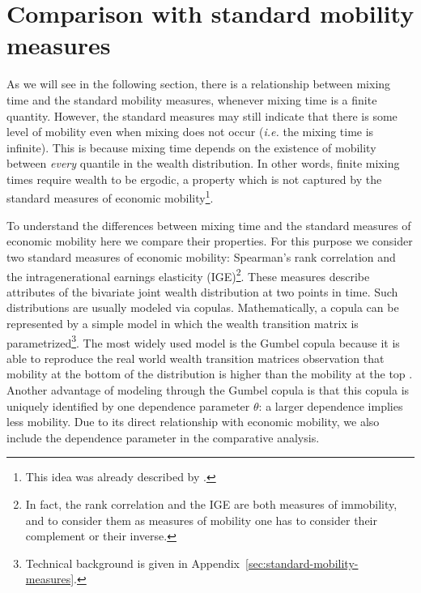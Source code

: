 \documentclass[11pt]{article}
\newcommand{\ie}{{\it i.e.}\xspace}
\numberwithin{equation}{section}
\begin{document}
\section{Comparison with standard mobility measures}
\label{sec:standard-measures}

As we will see in the following section, there is a relationship between mixing time and the standard mobility measures, whenever mixing time is a finite quantity. However, the standard measures may still indicate that there is some level of mobility even when mixing does not occur (\ie the mixing time is infinite). This is because mixing time depends on the existence of mobility between \textit{every} quantile in the wealth distribution. In other words, finite mixing times require wealth to be ergodic, a property which is not captured by the standard measures of economic mobility\footnote{This idea was already described by \citet{Mcfarland1970}.}.

To understand the differences between mixing time and the standard measures of economic mobility here we compare their properties. For this purpose we consider two standard measures of economic mobility: Spearman's rank correlation and the intragenerational earnings elasticity (IGE)\footnote{In fact, the rank correlation and the IGE are both measures of immobility, and to consider them as measures of mobility one has to consider their complement or their inverse.}. These measures describe attributes of the bivariate joint wealth distribution at two points in time. Such distributions are usually modeled via copulas. Mathematically, a copula can be represented by a simple model in which the wealth transition matrix is parametrized\footnote{Technical background is given in Appendix~\ref{sec:standard-mobility-measures}.}. The most widely used model is the Gumbel copula because it is able to reproduce the real world wealth transition matrices observation that mobility at the bottom of the distribution is higher than the mobility at the top \citep{JanttiJenkins2015}. Another advantage of modeling through the Gumbel copula is that this copula is uniquely identified by one dependence parameter $\theta$: a larger dependence implies less mobility. Due to its direct relationship with economic mobility, we also include the dependence parameter in the comparative analysis.
\end{document}
